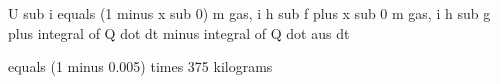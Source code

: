U sub i equals (1 minus x sub 0) m gas, i h sub f plus x sub 0 m gas, i h sub g plus integral of Q dot dt minus integral of Q dot aus dt

equals (1 minus 0.005) times 375 kilograms